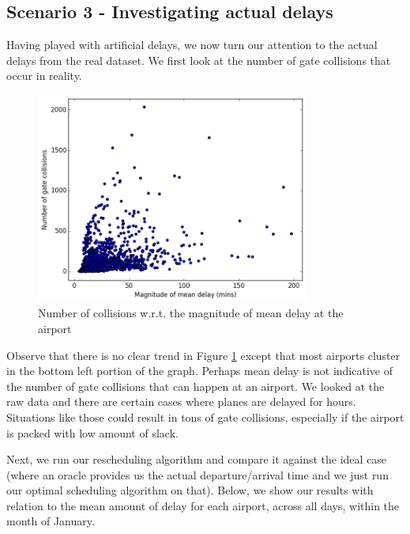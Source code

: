 \documentclass[12pt, a4paper]{report}
\begin{document}
\subsection{Scenario 3 - Investigating actual delays}
Having played with artificial delays, we now turn our attention to the actual delays from the real dataset. We first look at the number of gate collisions that occur in reality.

\begin{figure}[h!]
\centering
\includegraphics[width=0.8\textwidth]{../graph/3aiii.png}
\caption{Number of collisions w.r.t. the magnitude of mean delay at the airport \protect\footnotemark}
\label{fig:3aiii}
\end{figure}

Observe that there is no clear trend in Figure \ref{fig:3aiii} except that most airports cluster in the bottom left portion of the graph. Perhaps mean delay is not indicative of the number of gate collisions that can happen at an airport. We looked at the raw data and there are certain cases where planes are delayed for hours. Situations like those could result in tons of gate collisions, especially if the airport is packed with low amount of slack.

Next, we run our rescheduling algorithm and compare it against the ideal case (where an oracle provides us the actual departure/arrival time and we just run our optimal scheduling algorithm on that). Below, we show our results with relation to the mean amount of delay for each airport, across all days, within the month of January.
\end{document}
